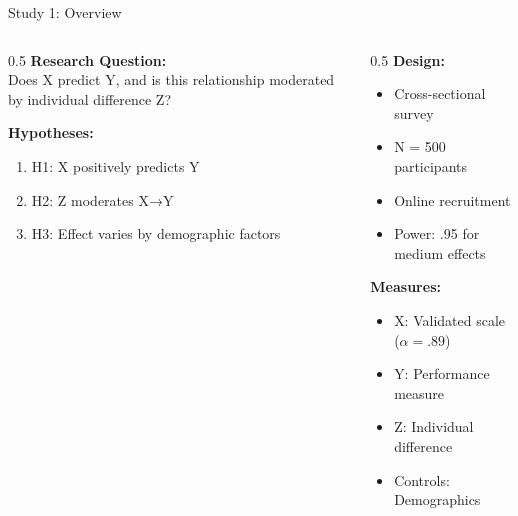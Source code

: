 \documentclass[aspectratio=169,12pt]{beamer}
\begin{document}
\begin{frame}{Study 1: Overview}
  \begin{columns}[T]
    
    \begin{column}{0.5\textwidth}
      \textbf{Research Question:}\\
      Does X predict Y, and is this relationship moderated by individual difference Z?
      
      \vspace{0.5cm}
      
      \textbf{Hypotheses:}
      \begin{enumerate}
        \item H1: X positively predicts Y
        \item H2: Z moderates X→Y
        \item H3: Effect varies by demographic factors
      \end{enumerate}
    \end{column}
    
    \begin{column}{0.5\textwidth}
      \textbf{Design:}
      \begin{itemize}
        \item Cross-sectional survey
        \item N = 500 participants
        \item Online recruitment
        \item Power: .95 for medium effects
      \end{itemize}
      
      \vspace{0.3cm}
      
      \textbf{Measures:}
      \begin{itemize}
        \item X: Validated scale ($\alpha = .89$)
        \item Y: Performance measure
        \item Z: Individual difference
        \item Controls: Demographics
      \end{itemize}
    \end{column}
    
  \end{columns}
\end{frame}
\end{document}
